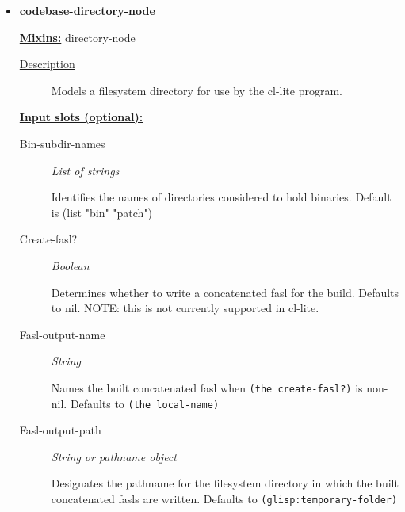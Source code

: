 \documentclass [11pt]{book}
\begin{document}
\begin{itemize}

\item {}
\label{prim:codebase-directory-node}
\textbf{codebase-directory-node}


\textbf{
\underline{Mixins:}} directory-node





\begin{description}

\item [
\underline{Description}]


Models a filesystem directory for use by the cl-lite program.



\end{description}








\textbf{
\underline{Input slots (optional):}}

\begin{description}

\item [Bin-subdir-names]
\emph{List of strings}

 Identifies the names of directories considered to hold binaries.
Default is (list "bin" "patch")




\item [Create-fasl?]
\emph{Boolean}

 Determines whether to write a concatenated fasl for the build. Defaults to nil.
NOTE: this is not currently supported in cl-lite.




\item [Fasl-output-name]
\emph{String}

 Names the built concatenated fasl when \texttt{(the create-fasl?)} is non-nil.
Defaults to \texttt{(the local-name)}




\item [Fasl-output-path]
\emph{String or pathname object}

 Designates the pathname for the filesystem directory in which
the built concatenated fasls are written. Defaults to \texttt{(glisp:temporary-folder)}





\end{description}
\end{itemize}
\end{document}
